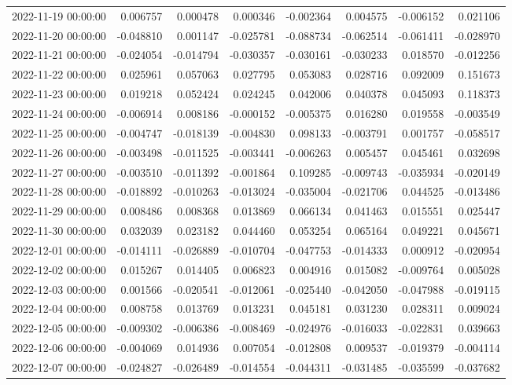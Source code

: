 \begin{tabular}{lrrrrrrr}
2022-11-19 00:00:00 & 0.006757 & 0.000478 & 0.000346 & -0.002364 & 0.004575 & -0.006152 & 0.021106 \\
2022-11-20 00:00:00 & -0.048810 & 0.001147 & -0.025781 & -0.088734 & -0.062514 & -0.061411 & -0.028970 \\
2022-11-21 00:00:00 & -0.024054 & -0.014794 & -0.030357 & -0.030161 & -0.030233 & 0.018570 & -0.012256 \\
2022-11-22 00:00:00 & 0.025961 & 0.057063 & 0.027795 & 0.053083 & 0.028716 & 0.092009 & 0.151673 \\
2022-11-23 00:00:00 & 0.019218 & 0.052424 & 0.024245 & 0.042006 & 0.040378 & 0.045093 & 0.118373 \\
2022-11-24 00:00:00 & -0.006914 & 0.008186 & -0.000152 & -0.005375 & 0.016280 & 0.019558 & -0.003549 \\
2022-11-25 00:00:00 & -0.004747 & -0.018139 & -0.004830 & 0.098133 & -0.003791 & 0.001757 & -0.058517 \\
2022-11-26 00:00:00 & -0.003498 & -0.011525 & -0.003441 & -0.006263 & 0.005457 & 0.045461 & 0.032698 \\
2022-11-27 00:00:00 & -0.003510 & -0.011392 & -0.001864 & 0.109285 & -0.009743 & -0.035934 & -0.020149 \\
2022-11-28 00:00:00 & -0.018892 & -0.010263 & -0.013024 & -0.035004 & -0.021706 & 0.044525 & -0.013486 \\
2022-11-29 00:00:00 & 0.008486 & 0.008368 & 0.013869 & 0.066134 & 0.041463 & 0.015551 & 0.025447 \\
2022-11-30 00:00:00 & 0.032039 & 0.023182 & 0.044460 & 0.053254 & 0.065164 & 0.049221 & 0.045671 \\
2022-12-01 00:00:00 & -0.014111 & -0.026889 & -0.010704 & -0.047753 & -0.014333 & 0.000912 & -0.020954 \\
2022-12-02 00:00:00 & 0.015267 & 0.014405 & 0.006823 & 0.004916 & 0.015082 & -0.009764 & 0.005028 \\
2022-12-03 00:00:00 & 0.001566 & -0.020541 & -0.012061 & -0.025440 & -0.042050 & -0.047988 & -0.019115 \\
2022-12-04 00:00:00 & 0.008758 & 0.013769 & 0.013231 & 0.045181 & 0.031230 & 0.028311 & 0.009024 \\
2022-12-05 00:00:00 & -0.009302 & -0.006386 & -0.008469 & -0.024976 & -0.016033 & -0.022831 & 0.039663 \\
2022-12-06 00:00:00 & -0.004069 & 0.014936 & 0.007054 & -0.012808 & 0.009537 & -0.019379 & -0.004114 \\
2022-12-07 00:00:00 & -0.024827 & -0.026489 & -0.014554 & -0.044311 & -0.031485 & -0.035599 & -0.037682 \\

\end{tabular}
